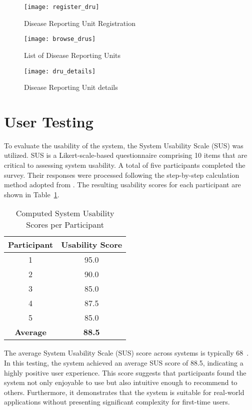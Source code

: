 \begin{figure}[H]
	\centering
	\texttt{[image: register\_dru]}
	\caption{Disease Reporting Unit Registration}
	\label{fig:register_dru}
\end{figure}
\begin{figure}[H]
	\centering
	\texttt{[image: browse\_drus]}
	\caption{List of Disease Reporting Units}
	\label{fig:browse_drus}
\end{figure}
\begin{figure}[H]
	\centering
	\texttt{[image: dru\_details]}
	\caption{Disease Reporting Unit details}
	\label{fig:dru_details}
\end{figure}


\section{User Testing}
To evaluate the usability of the system, the System Usability Scale (SUS) was utilized. SUS is a Likert-scale-based questionnaire comprising 10 items that are critical to assessing system usability. A total of five participants completed the survey. Their responses were processed following the step-by-step calculation method adopted from \cite{babich_sus_usability_website}. The resulting usability scores for each participant are shown in Table~\ref{tab:sus_scores}.

\begin{table}[h!]
	\centering
	\begin{tabular}{|c|c|}
		\hline
		\textbf{Participant} & \textbf{Usability Score} \\
		\hline
		1 & 95.0 \\
		2 & 90.0 \\
		3 & 85.0 \\
		4 & 87.5 \\
		5 & 85.0 \\
		\hline
		\textbf{Average} & \textbf{88.5} \\
		\hline
	\end{tabular}
	\caption{Computed System Usability Scores per Participant}
	\label{tab:sus_scores}
\end{table}

The average System Usability Scale (SUS) score across systems is typically 68~\cite{babich_sus_usability_website}. In this testing, the system achieved an average SUS score of 88.5, indicating a highly positive user experience. This score suggests that participants found the system not only enjoyable to use but also intuitive enough to recommend to others. Furthermore, it demonstrates that the system is suitable for real-world applications without presenting significant complexity for first-time users.




